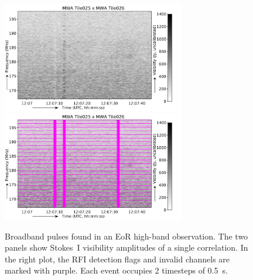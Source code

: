 \documentclass{pasa}
\begin{document}
\noindent\begin{figure}%
\begin{center}\hspace*{-0.2cm}\includegraphics[width=8cm]{img/broadband-pulse-unflagged}\includegraphics[width=8cm]{img/broadband-pulse-flagged}
\end{center}
\caption{Broadband pulses found in an EoR high-band observation. The two panels show Stokes~I visibility amplitudes of a single correlation. In the right plot, the RFI detection flags and invalid channels are marked with purple. Each event occupies 2 timesteps of 0.5~s.}
\label{fig:broadband-pulse}
\end{figure}
\end{document}
